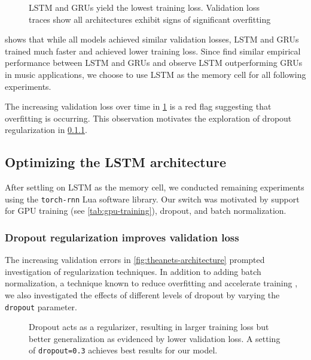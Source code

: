 \begin{figure}[tb]
    \centering
    
    \caption{LSTM and GRUs yield the lowest training loss. Validation loss
      traces show all architectures exhibit signs of significant overfitting}
    \label{fig:theanets-architecture}
\end{figure}

 shows that while all models achieved similar
validation losses, LSTM and GRUs trained much faster and achieved lower
training loss. Since \citet{zaremba2015empirical} find similar empirical
performance between LSTM and GRUs and \citet{Nayebi2015} observe LSTM
outperforming GRUs in music applications, we choose to use LSTM as the memory
cell for all following experiments.

The increasing validation loss over time in \cref{fig:theanets-architecture}
is a red flag suggesting that overfitting is occurring. This observation motivates
the exploration of dropout regularization in \cref{sec:lstm-dropout}.

\subsection{Optimizing the LSTM architecture}\label{sec:lstm-grid-search}

After settling on LSTM as the memory cell, we conducted remaining experiments
using the \texttt{torch-rnn} Lua software library. Our switch was motivated by
support for GPU training (see \vref{tab:gpu-training}), dropout, and batch normalization.

\subsubsection{Dropout regularization improves validation loss}\label{sec:lstm-dropout}

The increasing validation errors in \vref{fig:theanets-architecture} prompted
investigation of regularization techniques. In addition to adding batch
normalization, a technique known to reduce overfitting and accelerate training
\citep{ioffe2015batch}, we also investigated the effects of different levels
of dropout by varying the \texttt{dropout} parameter.

\begin{figure}[tb]
  \centering
  
  \caption{Dropout acts as a regularizer, resulting in larger training loss
  but better generalization as evidenced by lower validation loss. A setting of
\texttt{dropout=0.3} achieves best results for our model.}
  \label{fig:torch-rnn-dropout}
\end{figure}

